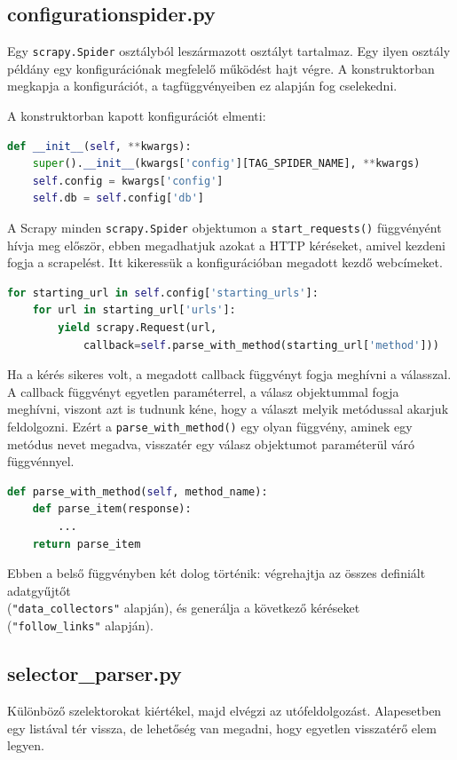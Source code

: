 \documentclass[10pt]{article}
\begin{document}
\subsection{configurationspider.py}
Egy \lstinline{scrapy.Spider} osztályból leszármazott osztályt tartalmaz. Egy ilyen osztály példány egy konfigurációnak megfelelő működést hajt végre. A konstruktorban megkapja a konfigurációt, a tagfüggvényeiben ez alapján fog cselekedni.

A konstruktorban kapott konfigurációt elmenti:
\begin{lstlisting}[language=Python,frame=single]
def __init__(self, **kwargs):
    super().__init__(kwargs['config'][TAG_SPIDER_NAME], **kwargs)
    self.config = kwargs['config']
    self.db = self.config['db']
\end{lstlisting}

A Scrapy minden \lstinline{scrapy.Spider} objektumon a  \lstinline{start_requests()} függvényént hívja meg először, ebben megadhatjuk azokat a HTTP kéréseket, amivel kezdeni fogja a scrapelést. Itt kikeressük a konfigurációban megadott kezdő webcímeket.
\begin{lstlisting}[language=Python,frame=single]
for starting_url in self.config['starting_urls']:
    for url in starting_url['urls']:
        yield scrapy.Request(url, 
            callback=self.parse_with_method(starting_url['method']))
\end{lstlisting}

Ha a kérés sikeres volt, a megadott callback függvényt fogja meghívni a válasszal. 
A callback függvényt egyetlen paraméterrel, a válasz objektummal fogja meghívni, viszont azt is tudnunk kéne, hogy a választ melyik metódussal akarjuk feldolgozni.
Ezért a \lstinline{parse_with_method()} egy olyan függvény, aminek egy metódus nevet megadva, visszatér egy válasz objektumot paraméterül váró függvénnyel.

\begin{lstlisting}[language=Python,frame=single]
def parse_with_method(self, method_name):
    def parse_item(response):
        ...        
    return parse_item

\end{lstlisting}

Ebben a belső függvényben két dolog történik: végrehajtja az összes definiált adatgyűjtőt \\ (\lstinline{"data_collectors"} alapján), és generálja a következő kéréseket (\lstinline{"follow_links"} alapján).

\subsection{selector\_parser.py}
Különböző szelektorokat kiértékel, majd elvégzi az utófeldolgozást. Alapesetben egy listával tér vissza, de lehetőség van megadni, hogy egyetlen visszatérő elem legyen.
\end{document}
